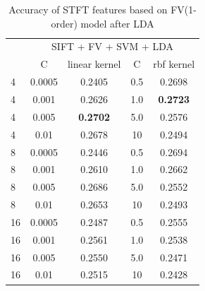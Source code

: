 \documentclass[conference]{IEEEtran}
\begin{document}
\begin{table}[htbp]
	\centering
	\newcommand{\tabincell}[2]{\begin{tabular}{@{}#1@{}}#2\end{tabular}}
	\renewcommand\arraystretch{1.0}
	\caption{Accuracy of STFT features based on FV(1-order) model after LDA}
	\label{base7}%
	\begin{tabular}{@{}p{1cm}<{\centering}|c|c|c|c}
		\hline
		\multirow{2}{*}{\diagbox[height=2\line,width=1.42cm,font=\tiny]{$k$}{Acc.}{$\mathit{M}$}} &
		\multicolumn{4}{c}{SIFT + FV + SVM + LDA}\\
		\cline{2-5}
		& {C} & {linear kernel} & {C} & {rbf kernel}\\
		\hline
		4   & 0.0005  & 0.2405 & 0.5 & 0.2698\\
		4   & 0.001  & 0.2626 & 1.0 & \textbf{0.2723}\\
		4   & 0.005  & \textbf{0.2702} & 5.0 & 0.2576\\
        4   & 0.01  & 0.2678 & 10 & 0.2494\\
        \hline
		8   & 0.0005 & 0.2446 & 0.5 & 0.2694\\
		8   & 0.001 & 0.2610 & 1.0 & 0.2662\\
		8   & 0.005 & 0.2686 & 5.0 & 0.2552\\
        8   & 0.01  & 0.2653 & 10 & 0.2493\\
        \hline
		16   & 0.0005  & 0.2487 & 0.5 & 0.2555\\
		16   & 0.001  & 0.2561 & 1.0 & 0.2538\\
		16   & 0.005  & 0.2550 & 5.0 & 0.2471\\
		16   & 0.01  & 0.2515 & 10 & 0.2428\\
		\hline
	\end{tabular}
\end{table}
\end{document}
